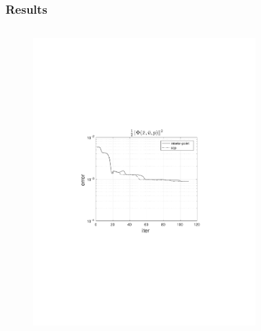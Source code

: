 \begin{frame}
    \frametitle{Results}
    \begin{columns}[t]
            \begin{figure}
                \centering
                \includegraphics[trim=4cm 9cm 4cm 8.5cm, clip=true, width=\linewidth]{img/convPlotPhi}
            \end{figure}
            \begin{figure}
                \centering

\end{figure}
\end{columns}
\end{frame}
